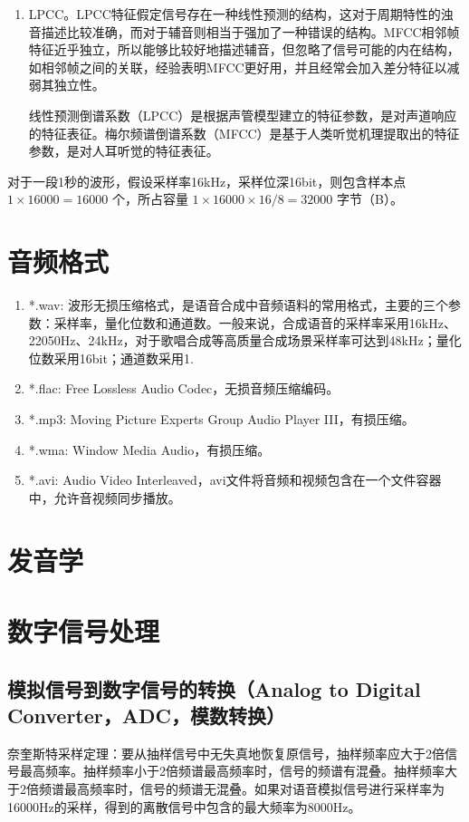 \documentclass[cn,10pt,math=newtx,citestyle=gb7714-2015,bibstyle=gb7714-2015]{elegantbook}
\begin{document}
\begin{enumerate}
  \item LPCC。LPCC特征假定信号存在一种线性预测的结构，这对于周期特性的浊音描述比较准确，而对于辅音则相当于强加了一种错误的结构。MFCC相邻帧特征近乎独立，所以能够比较好地描述辅音，但忽略了信号可能的内在结构，如相邻帧之间的关联，经验表明MFCC更好用，并且经常会加入差分特征以减弱其独立性。
  \begin{note}
    线性预测倒谱系数（LPCC）是根据声管模型建立的特征参数，是对声道响应的特征表征。梅尔频谱倒谱系数（MFCC）是基于人类听觉机理提取出的特征参数，是对人耳听觉的特征表征。
  \end{note}
\end{enumerate}

对于一段1秒的波形，假设采样率16kHz，采样位深16bit，则包含样本点 $1\times 16000=16000$ 个，所占容量 $1\times 16000\times 16 /8=32000$ 字节（B）。

\section{音频格式}
\begin{enumerate}
  \item *.wav: 波形无损压缩格式，是语音合成中音频语料的常用格式，主要的三个参数：采样率，量化位数和通道数。一般来说，合成语音的采样率采用16kHz、22050Hz、24kHz，对于歌唱合成等高质量合成场景采样率可达到48kHz；量化位数采用16bit；通道数采用1.
  \item *.flac: Free Lossless Audio Codec，无损音频压缩编码。
  \item *.mp3: Moving Picture Experts Group Audio Player III，有损压缩。
  \item *.wma: Window Media Audio，有损压缩。
  \item *.avi: Audio Video Interleaved，avi文件将音频和视频包含在一个文件容器中，允许音视频同步播放。
\end{enumerate}

\section{发音学}

\section{数字信号处理}
\subsection{模拟信号到数字信号的转换（Analog to Digital Converter，ADC，模数转换）}
奈奎斯特采样定理：要从抽样信号中无失真地恢复原信号，抽样频率应大于2倍信号最高频率。抽样频率小于2倍频谱最高频率时，信号的频谱有混叠。抽样频率大于2倍频谱最高频率时，信号的频谱无混叠。如果对语音模拟信号进行采样率为16000Hz的采样，得到的离散信号中包含的最大频率为8000Hz。
\end{document}
